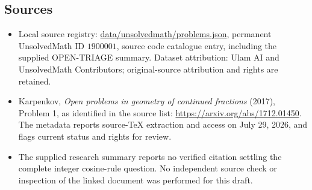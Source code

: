 \documentclass[11pt]{article}
\begin{document}
\subsection{Sources}
\begin{itemize}
\item Local source registry: \url{data/unsolvedmath/problems.json}, permanent UnsolvedMath ID $1900001$, source code catalogue entry, including the supplied OPEN-TRIAGE summary. Dataset attribution: Ulam AI and UnsolvedMath Contributors; original-source attribution and rights are retained.
\item Karpenkov, \emph{Open problems in geometry of continued fractions} (2017), Problem 1, as identified in the source list: \url{https://arxiv.org/abs/1712.01450}. The metadata reports source-TeX extraction and access on July 29, 2026, and flags current status and rights for review.
\item The supplied research summary reports no verified citation settling the complete integer cosine-rule question. No independent source check or inspection of the linked document was performed for this draft.
\end{itemize}
\end{document}
